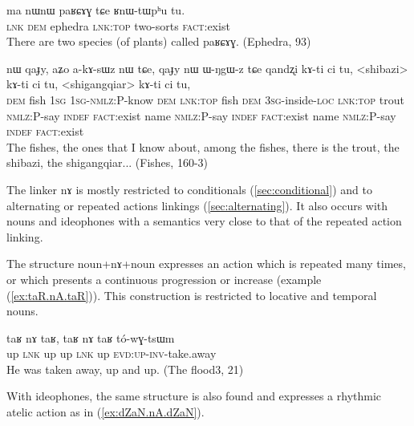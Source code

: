 \documentclass[oldfontcommands,oneside,a4paper,11pt]{article}
\newcommand{\ipa}[1]{{\phon \mbox{#1}}} %
\newcommand{\refb}[1]{(\ref{#1})}
\begin{document}
 \begin{exe}
\ex \label{ex:paRCAG} 
\gll
\ipa{ma}   	\ipa{nɯnɯ}   	\ipa{paʁɕɤɣ}   	\ipa{tɕe}   	\ipa{ʁnɯ-tɯpʰu}   	\ipa{tu.}   \\
\textsc{lnk} \textsc{dem} ephedra \textsc{lnk:top} two-sorts \textsc{fact}:exist \\
\glt There are two species (of plants) called \ipa{paʁɕɤɣ}. (Ephedra, 93)
\end{exe}

 \begin{exe}
\ex \label{ex:qaJy} 
\gll
\ipa{nɯ}  	\ipa{qaɟy,}  	\ipa{aʑo}  	\ipa{a-kɤ-sɯz}  	\ipa{nɯ}  	\ipa{tɕe,}  	\ipa{qaɟy}  	\ipa{nɯ}  	\ipa{ɯ-ŋgɯ-z}  	\ipa{tɕe}  	\ipa{qandʐi}  	\ipa{kɤ-ti}  	\ipa{ci}  	\ipa{tu,}  	<shibazi>  	\ipa{kɤ-ti}  	\ipa{ci}  	\ipa{tu,}  	<shigangqiar>  	\ipa{kɤ-ti}  	\ipa{ci}  	\ipa{tu,}  \\
\textsc{dem} fish \textsc{1sg} \textsc{1sg-nmlz:P}-know \textsc{dem} \textsc{lnk:top} fish \textsc{dem} \textsc{3sg}-inside-\textsc{loc} \textsc{lnk:top}  trout \textsc{nmlz}:P-say \textsc{indef} \textsc{fact}:exist   name  \textsc{nmlz}:P-say \textsc{indef} \textsc{fact}:exist   name  \textsc{nmlz}:P-say \textsc{indef} \textsc{fact}:exist  \\
\glt The fishes, the ones that I know about, among the fishes, there is the trout, the shibazi, the shigangqiar... (Fishes, 160-3)
\end{exe}

The linker \ipa{nɤ} is mostly restricted to conditionals \refb{sec:conditional} and to alternating or repeated actions linkings \refb{sec:alternating}. It also occurs with nouns  and ideophones with a semantics very close to that of the repeated action linking. 

The structure noun+\ipa{nɤ}+noun   expresses an action which is repeated many times, or which presents a continuous progression or increase   (example \refb{ex:taR.nA.taR}). This construction is   restricted to locative and temporal nouns. 

 \begin{exe}
\ex \label{ex:taR.nA.taR} 
\gll
\ipa{taʁ}   	\ipa{nɤ}   	\ipa{taʁ,}   	\ipa{taʁ}   	\ipa{nɤ}   	\ipa{taʁ}   	\ipa{tó-wɣ-tsɯm}   \\
up \textsc{lnk} up up \textsc{lnk} up \textsc{evd:up-inv-}take.away \\
\glt He was taken away, up and up. (The flood3, 21)
\end{exe}

With  ideophones, the same structure  is also found and expresses a rhythmic atelic action as in \refb{ex:dZaN.nA.dZaN}.
 
\end{document}
